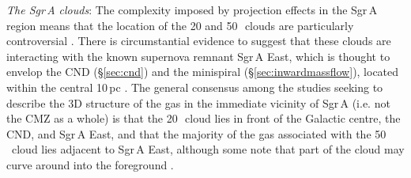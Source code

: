\noindent\emph{The Sgr\,A clouds}: The complexity imposed by projection effects in the Sgr\,A region means that the location of the 20 and 50\,\kms \ clouds are particularly controversial \citep[see ][for a comprehensive summary]{Ferriere2012}. 
There is circumstantial evidence to suggest that these clouds are interacting with the known supernova remnant Sgr\,A East, which is thought to envelop the CND (\S\ref{sec:cnd}) and the minispiral (\S\ref{sec:inwardmassflow}), located within the central 10\,pc \citep{Zylka1990,Ho1991,Serabyn1992,Coil1999, Coil2000, Yusef-Zadeh1999a, Sjouwerman2008, Hsieh2017, Hsieh2019, Tsuboi2018, Tanaka2021}. 
The general consensus among the studies seeking to describe the 3D structure of the gas in the immediate vicinity of Sgr\,A (i.e. not the CMZ as a whole) is that the 20\,\kms \ cloud lies in front of the Galactic centre, the CND, and Sgr\,A East, and that the majority of the gas associated with the 50\,\kms \ cloud lies adjacent to Sgr\,A East, although some note that part of the cloud may curve around into the foreground \citep{Herrnstein2005, Lee2008}.

